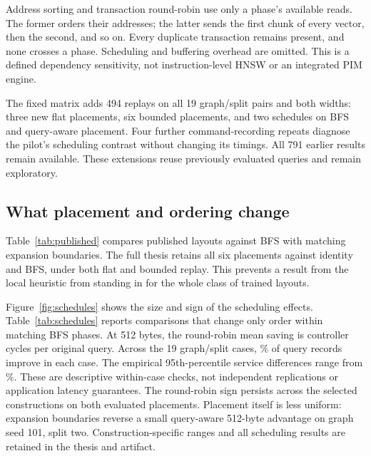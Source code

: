 Address sorting and transaction round-robin use only a phase's available reads. The former orders their addresses; the latter sends the first chunk of every vector, then the second, and so on. Every duplicate transaction remains present, and none crosses a phase. Scheduling and buffering overhead are omitted. This is a defined dependency sensitivity, not instruction-level HNSW or an integrated PIM engine.

The fixed matrix adds 494 replays on all 19 graph/split pairs and both widths: three new flat placements, six bounded placements, and two schedules on BFS and query-aware placement. Four further command-recording repeats diagnose the pilot's scheduling contrast without changing its timings. All 791 earlier results remain available. These extensions reuse previously evaluated queries and remain exploratory.

\subsection{What placement and ordering change}
Table~\ref{tab:published} compares published layouts against BFS with matching expansion boundaries. The full thesis retains all six placements against identity and BFS, under both flat and bounded replay. This prevents a result from the local heuristic from standing in for the whole class of trained layouts.

\begin{table}[htbp]\centering\small
\caption{Published placement routines under bounded replay. Mean cycle differences and 95\% intervals over ten reference splits. Negative means fewer cycles than matching BFS.}\label{tab:published}

\end{table}

Figure~\ref{fig:schedules} shows the size and sign of the scheduling effects. Table~\ref{tab:schedules} reports comparisons that change only order within matching BFS phases. At 512 bytes, the round-robin mean saving is \RoundRobinBFSSavedFloat{} controller cycles per original query. Across the 19 graph/split cases, \RRFasterQueriesFloat\% of query records improve in each case. The empirical 95th-percentile service differences range from \RRPtailRangeFloat\%. These are descriptive within-case checks, not independent replications or application latency guarantees. The round-robin sign persists across the selected constructions on both evaluated placements. Placement itself is less uniform: expansion boundaries reverse a small query-aware 512-byte advantage on graph seed 101, split two. Construction-specific ranges and all scheduling results are retained in the thesis and artifact.

